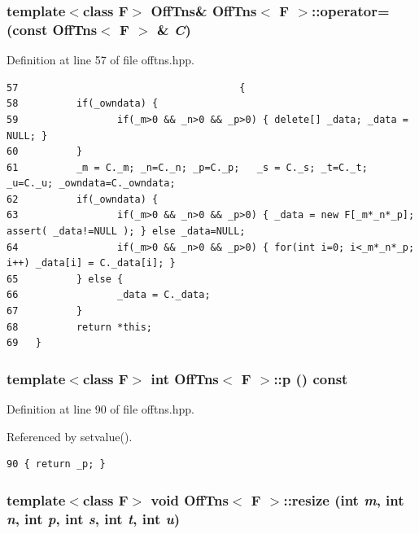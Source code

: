 \subsubsection{\setlength{\rightskip}{0pt plus 5cm}template$<$class F$>$ {\bf Off\-Tns}\& {\bf Off\-Tns}$<$ F $>$::operator= (const {\bf Off\-Tns}$<$ F $>$ \& {\em C})\hspace{0.3cm}{\tt  [inline]}}\label{classOffTns_d0de1164134225e87500d29dac47fbc8_d0de1164134225e87500d29dac47fbc8}




Definition at line 57 of file offtns.hpp.

\footnotesize\begin{verbatim}57                                      {
58          if(_owndata) { 
59                 if(_m>0 && _n>0 && _p>0) { delete[] _data; _data = NULL; } 
60          }
61          _m = C._m; _n=C._n; _p=C._p;   _s = C._s; _t=C._t; _u=C._u; _owndata=C._owndata;
62          if(_owndata) {
63                 if(_m>0 && _n>0 && _p>0) { _data = new F[_m*_n*_p]; assert( _data!=NULL ); } else _data=NULL;
64                 if(_m>0 && _n>0 && _p>0) { for(int i=0; i<_m*_n*_p; i++) _data[i] = C._data[i]; }
65          } else {
66                 _data = C._data;
67          }
68          return *this;
69   }
\end{verbatim}\normalsize 


\subsubsection{\setlength{\rightskip}{0pt plus 5cm}template$<$class F$>$ int {\bf Off\-Tns}$<$ F $>$::p () const\hspace{0.3cm}{\tt  [inline]}}\label{classOffTns_7447c13ce6f46f262a0d6d072991620b_7447c13ce6f46f262a0d6d072991620b}




Definition at line 90 of file offtns.hpp.

Referenced by setvalue().

\footnotesize\begin{verbatim}90 { return _p; }
\end{verbatim}\normalsize 


\subsubsection{\setlength{\rightskip}{0pt plus 5cm}template$<$class F$>$ void {\bf Off\-Tns}$<$ F $>$::resize (int {\em m}, int {\em n}, int {\em p}, int {\em s}, int {\em t}, int {\em u})\hspace{0.3cm}{\tt  [inline]}}\label{classOffTns_69fb21a4615987ecc9e9a665e18965ec_69fb21a4615987ecc9e9a665e18965ec}




